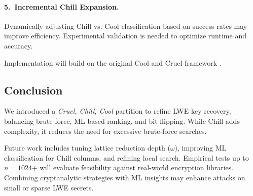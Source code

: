 \documentclass[conference]{IEEEtran}
\begin{document}
\paragraph{5.\ Incremental Chill Expansion.}
Dynamically adjusting Chill vs. Cool classification based on success rates may improve efficiency. Experimental validation is needed to optimize runtime and accuracy.

\begingroup
Implementation will build on the original Cool and Cruel framework \cite{lwe-benchmarking}.
\endgroup

\subsection{Conclusion}
We introduced a \emph{Cruel, Chill, Cool} partition to refine LWE key recovery, balancing brute force, ML-based ranking, and bit-flipping. While Chill adds complexity, it reduces the need for excessive brute-force searches. 

Future work includes tuning lattice reduction depth ($\omega$), improving ML classification for Chill columns, and refining local search. Empirical tests up to $n=1024$+ will evaluate feasibility against real-world encryption libraries. Combining cryptanalytic strategies with ML insights may enhance attacks on small or sparse LWE secrets.

  
  
\end{document}
